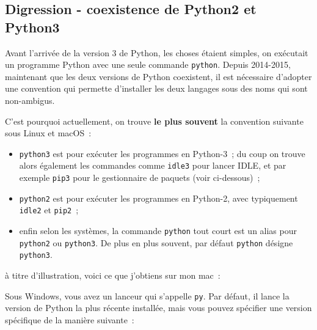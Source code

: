    \hypertarget{digression---coexistence-de-python2-et-python3}{%
\subsection{Digression - coexistence de Python2 et
Python3}\label{digression---coexistence-de-python2-et-python3}}

    Avant l'arrivée de la version 3 de Python, les choses étaient simples,
on exécutait un programme Python avec une seule commande
\texttt{python}. Depuis 2014-2015, maintenant que les deux versions de
Python coexistent, il est nécessaire d'adopter une convention qui
permette d'installer les deux langages sous des noms qui sont
non-ambigus.

C'est pourquoi actuellement, on trouve \textbf{le plus souvent} la
convention suivante sous Linux et macOS~:

\begin{itemize}
\item
  \texttt{python3} est pour exécuter les programmes en Python-3~; du
  coup on trouve alors également les commandes comme \texttt{idle3} pour
  lancer IDLE, et par exemple \texttt{pip3} pour le gestionnaire de
  paquets (voir ci-dessous)~;
\item
  \texttt{python2} est pour exécuter les programmes en Python-2, avec
  typiquement \texttt{idle2} et \texttt{pip2}~;
\item
  enfin selon les systèmes, la commande \texttt{python} tout court est
  un alias pour \texttt{python2} ou \texttt{python3}. De plus en plus
  souvent, par défaut \texttt{python} désigne \texttt{python3}.
\end{itemize}

à titre d'illustration, voici ce que j'obtiens sur mon mac~:

\begin{Shaded}
\begin{Highlighting}[frame=lines,framerule=0.6mm,rulecolor=\color{asisframecolor}]
\NormalTok{$ }
\NormalTok{$ }
\NormalTok{$ }
\end{Highlighting}
\end{Shaded}

Sous Windows, vous avez un lanceur qui s'appelle \texttt{py}. Par
défaut, il lance la version de Python la plus récente installée, mais
vous pouvez spécifier une version spécifique de la manière suivante~:

